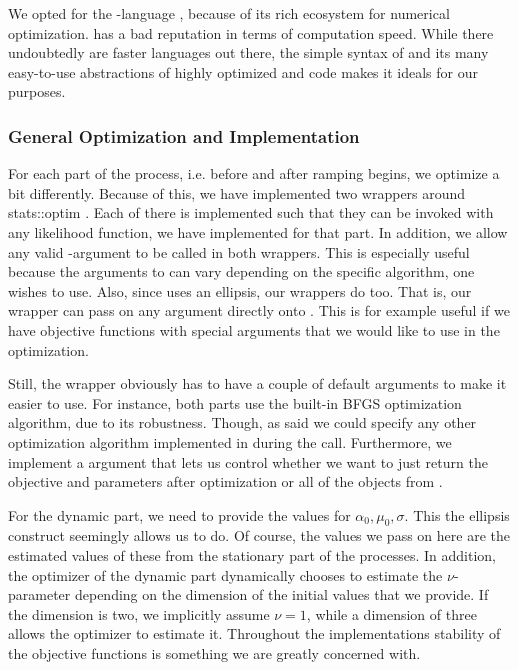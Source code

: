We opted for the -language \cite{Rlang}, because of its rich ecosystem for numerical optimization.  has a bad reputation in terms of computation speed. While there undoubtedly are faster languages out there, the simple syntax of  and its many easy-to-use abstractions of highly optimized  and  code makes it ideals for our purposes.
\subsubsection{General Optimization and Implementation}
For each part of the process, i.e. before and after ramping begins, we optimize a bit differently. Because of this, we have implemented two wrappers around {stats::optim} \cite{Rlang}. Each of there is implemented such that they can be invoked with any likelihood function, we have implemented for that part. In addition, we allow any valid -argument to be called in both wrappers. This is especially useful because the arguments to  can vary depending on the specific algorithm, one wishes to use. Also, since  uses an ellipsis, our wrappers do too. That is, our wrapper can pass on any argument directly onto . This is for example useful if we have objective functions with special arguments that we would like to use in the optimization.

Still, the wrapper obviously has to have a couple of default arguments to make it easier to use. For instance, both parts use the built-in BFGS optimization algorithm, due to its robustness. Though, as said we could specify any other optimization algorithm implemented in  during the call. Furthermore, we implement a  argument that lets us control whether we want to just return the objective and parameters after optimization or all of the objects from .

For the dynamic part, we need to provide the values for $\alpha_0, \mu_0, \sigma$. This the ellipsis construct seemingly allows us to do. Of course, the values we pass on here are the estimated values of these from the stationary part of the processes. In addition, the optimizer of the dynamic part dynamically chooses to estimate the $\nu$-parameter depending on the dimension of the initial values that we provide. If the dimension is two, we implicitly assume $\nu = 1$, while a dimension of three allows the optimizer to estimate it. Throughout the implementations stability of the objective functions is something we are greatly concerned with. 

